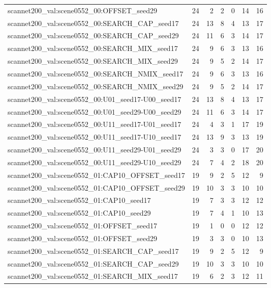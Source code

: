 \begin{table}[t]
\begin{tabular}{lrrrrrr}
scannet200\_val:scene0552\_00:OFFSET\_seed29 & 24 & 2 & 2 & 0 & 14 & 16 \\
scannet200\_val:scene0552\_00:SEARCH\_CAP\_seed17 & 24 & 13 & 8 & 4 & 13 & 17 \\
scannet200\_val:scene0552\_00:SEARCH\_CAP\_seed29 & 24 & 11 & 6 & 3 & 14 & 17 \\
scannet200\_val:scene0552\_00:SEARCH\_MIX\_seed17 & 24 & 9 & 6 & 3 & 13 & 16 \\
scannet200\_val:scene0552\_00:SEARCH\_MIX\_seed29 & 24 & 9 & 5 & 2 & 14 & 17 \\
scannet200\_val:scene0552\_00:SEARCH\_NMIX\_seed17 & 24 & 9 & 6 & 3 & 13 & 16 \\
scannet200\_val:scene0552\_00:SEARCH\_NMIX\_seed29 & 24 & 9 & 5 & 2 & 14 & 17 \\
scannet200\_val:scene0552\_00:U01\_seed17-U00\_seed17 & 24 & 13 & 8 & 4 & 13 & 17 \\
scannet200\_val:scene0552\_00:U01\_seed29-U00\_seed29 & 24 & 11 & 6 & 3 & 14 & 17 \\
scannet200\_val:scene0552\_00:U11\_seed17-U01\_seed17 & 24 & 4 & 3 & 1 & 17 & 19 \\
scannet200\_val:scene0552\_00:U11\_seed17-U10\_seed17 & 24 & 13 & 9 & 3 & 13 & 19 \\
scannet200\_val:scene0552\_00:U11\_seed29-U01\_seed29 & 24 & 3 & 3 & 0 & 17 & 20 \\
scannet200\_val:scene0552\_00:U11\_seed29-U10\_seed29 & 24 & 7 & 4 & 2 & 18 & 20 \\
scannet200\_val:scene0552\_01:CAP10\_OFFSET\_seed17 & 19 & 9 & 2 & 5 & 12 & 9 \\
scannet200\_val:scene0552\_01:CAP10\_OFFSET\_seed29 & 19 & 10 & 3 & 3 & 10 & 10 \\
scannet200\_val:scene0552\_01:CAP10\_seed17 & 19 & 7 & 3 & 3 & 12 & 12 \\
scannet200\_val:scene0552\_01:CAP10\_seed29 & 19 & 7 & 4 & 1 & 10 & 13 \\
scannet200\_val:scene0552\_01:OFFSET\_seed17 & 19 & 1 & 0 & 0 & 12 & 12 \\
scannet200\_val:scene0552\_01:OFFSET\_seed29 & 19 & 3 & 3 & 0 & 10 & 13 \\
scannet200\_val:scene0552\_01:SEARCH\_CAP\_seed17 & 19 & 9 & 2 & 5 & 12 & 9 \\
scannet200\_val:scene0552\_01:SEARCH\_CAP\_seed29 & 19 & 10 & 3 & 3 & 10 & 10 \\
scannet200\_val:scene0552\_01:SEARCH\_MIX\_seed17 & 19 & 6 & 2 & 3 & 12 & 11 \\

\end{tabular}
\end{table}
